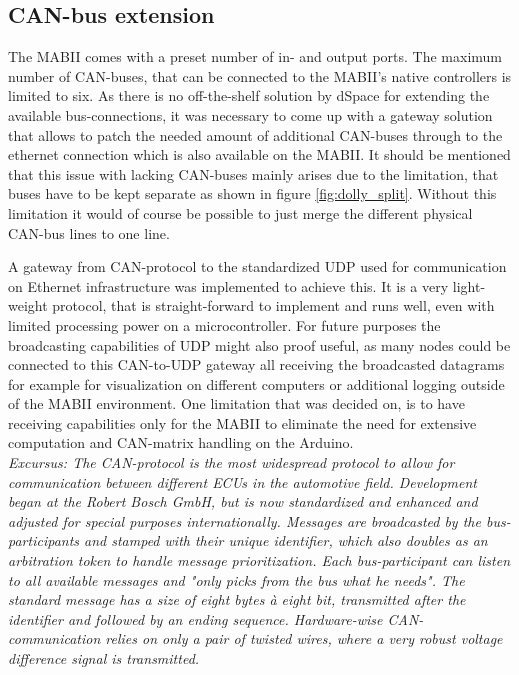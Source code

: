 \documentclass[ExampleMasters.tex]{subfiles}
\begin{document}
\subsection{CAN-bus extension}
\label{sec:can_udp_gateway}
The \gls{MABII} comes with a preset number of in- and output ports. The maximum number of CAN-buses, that can be connected to the \gls{MABII}'s native controllers is limited to six. As there is no off-the-shelf solution by dSpace for extending the available bus-connections, it was necessary to come up with a gateway solution that allows to patch the needed amount of additional \gls{CAN}-buses through to the ethernet connection which is also available on the \gls{MABII}. It should be mentioned that this issue with lacking CAN-buses mainly arises due to the limitation, that buses have to be kept separate as shown in figure \ref{fig:dolly_split}. Without this limitation it would of course be possible to just merge the different physical CAN-bus lines to one line.

A gateway from CAN-protocol to the standardized \gls{UDP} used for communication on Ethernet  infrastructure was implemented to achieve this. It is a very light-weight protocol, that is straight-forward to implement and runs well, even with limited processing power on a microcontroller. For future purposes the broadcasting capabilities of \gls{UDP} might also proof useful, as many nodes could be connected to this \gls{CAN}-to-\gls{UDP} gateway all receiving the broadcasted datagrams for example for visualization on different computers or additional logging outside of the \gls{MABII} environment. One limitation that was decided on, is to have receiving capabilities only for the \gls{MABII} to eliminate the need for extensive computation and CAN-matrix handling on the Arduino. \\


\textit{Excursus: The \gls{CAN}-protocol is the most widespread protocol to allow for communication between different \gls{ECU}s in the automotive field. Development began at the Robert Bosch GmbH, but is now standardized and enhanced and adjusted for special purposes internationally. Messages are broadcasted by the bus-participants and stamped with their unique identifier, which also doubles as an arbitration token to handle message prioritization. Each bus-participant can listen to all available messages and "only picks from the bus what he needs". The standard message has a size of eight bytes \`{a} eight bit, transmitted after the identifier and followed by an ending sequence. Hardware-wise \gls{CAN}-communication relies on only a pair of twisted wires, where a very robust voltage difference signal is transmitted. }\cite{CAN_intro}\\
\end{document}
